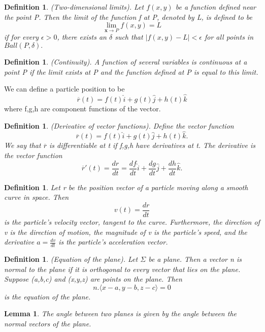 \documentclass[twoside]{article}
\newtheorem{lemma}[theorem]{Lemma}
\newtheorem{definition}[theorem]{Definition}
\begin{document}
\begin{definition}(Two-dimensional limits). Let $f(x,y)$ be a function defined near the point P. Then the limit of the function f at P, denoted by L, is defined to be 
$$
\lim_{\textbf{x} \rightarrow P}f(x,y) = L
$$
if for every $\epsilon > 0$, there exists an $\delta$ such that $|f(x,y) - L| < \epsilon$ for all points in $Ball(P, \delta).$
\end{definition}

\begin{definition}(Continuity). A function of several variables is continuous at a point P if the limit exists at P and the function defined at P is equal to this limit.
\end{definition}

We can define a particle position to be 
$$
\overline{r}(t) = f(t)\hat{i} + g(t)\hat{j} + h(t)\hat{k}
$$
where f,g,h are component functions of the vector. 

\begin{definition}(Derivative of vector functions). Define the vector function 
$$
\overline{r}(t) = f(t)\hat{i} + g(t)\hat{j} + h(t)\hat{k}.
$$
We say that $\overline{r}$ is differentiable at t if f,g,h have derivatives at t. The derivative is the vector function 
$$
\overline{r}'(t) = \frac{dr}{dt} = \frac{df}{dt}\hat{i} + \frac{dg}{dt}\hat{j} + \frac{dh}{dt}\hat{k}.
$$
\end{definition}

\begin{definition}Let r be the position vector of a particle moving along a smooth curve in space. Then 
$$
v(t) = \frac{dr}{dt}
$$
is the particle's velocity vector, tangent to the curve. Furthermore, the direction of v is the direction of motion, the magnitude of v is the particle's speed, and the derivative $a = \frac{dv}{dt}$ is the particle's acceleration vector.
\end{definition}

\begin{definition}(Equation of the plane). Let $\Sigma$ be a plane. Then a vector n is normal to the plane if it is orthogonal to every vector that lies on the plane. Suppose (a,b,c) and (x,y,z) are points on the plane. Then 
$$
n.\langle x-a,y-b,z-c \rangle = 0
$$
is the equation of the plane.
\end{definition}

\begin{lemma}The angle between two planes is given by the angle between the normal vectors of the plane.
\end{lemma}
\end{document}

